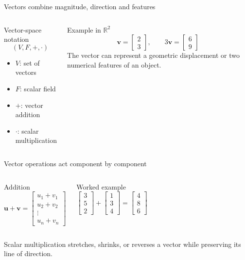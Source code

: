 \documentclass[aspectratio=169,11pt]{beamer}
\begin{document}
\begin{frame}{Vectors combine magnitude, direction and features}
\begin{columns}[T,onlytextwidth]
\begin{block}{Vector-space notation}
\[
(V,F,+,\cdot)
\]
\begin{itemize}
  \item $V$: set of vectors
  \item $F$: scalar field
  \item $+$: vector addition
  \item $\cdot$: scalar multiplication
\end{itemize}
\end{block}
\begin{exampleblock}{Example in $\mathbb R^2$}
\[
\bm v=\begin{bmatrix}2\\3\end{bmatrix},\qquad
3\bm v=\begin{bmatrix}6\\9\end{bmatrix}
\]
The vector can represent a geometric displacement or two numerical features of an object.
\end{exampleblock}
\end{columns}
\end{frame}

\begin{frame}{Vector operations act component by component}
\begin{columns}[T,onlytextwidth]
\begin{block}{Addition}
\[
\bm u+\bm v=
\begin{bmatrix}u_1+v_1\\u_2+v_2\\\vdots\\u_n+v_n\end{bmatrix}
\]
\end{block}
\begin{exampleblock}{Worked example}
\[
\begin{bmatrix}3\\5\\2\end{bmatrix}+
\begin{bmatrix}1\\3\\4\end{bmatrix}=
\begin{bmatrix}4\\8\\6\end{bmatrix}
\]
\end{exampleblock}
\end{columns}
\vspace{0.25cm}
Scalar multiplication stretches, shrinks, or reverses a vector while preserving its line of direction.
\end{frame}
\end{document}
